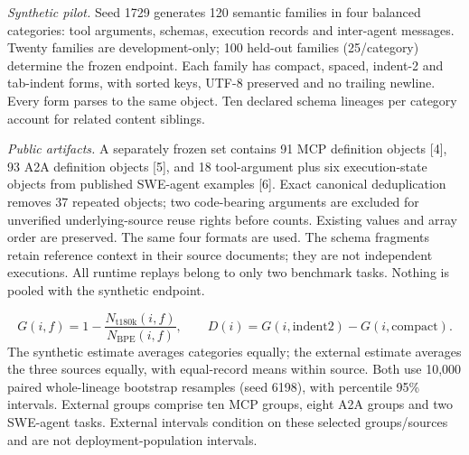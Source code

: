 \documentclass[10pt,a4paper]{article}
\begin{document}
\emph{Synthetic pilot.} Seed 1729 generates 120 semantic families in four
balanced categories: tool arguments, schemas, execution records and inter-agent
messages. Twenty families are development-only; 100 held-out families
(25/category) determine the frozen endpoint. Each family has compact, spaced,
indent-2 and tab-indent forms, with sorted keys, UTF-8 preserved and no trailing
newline. Every form parses to the same object. Ten declared schema lineages per
category account for related content siblings.

\emph{Public artifacts.} A separately frozen set contains 91 MCP definition
objects [4], 93 A2A definition objects [5], and 18 tool-argument plus six
execution-state objects from published SWE-agent examples [6].
Exact canonical deduplication removes 37 repeated objects; two code-bearing
arguments are excluded for unverified underlying-source reuse rights before
counts. Existing values and array order are preserved. The same four formats
are used. The schema fragments retain reference context in their source
documents; they are not independent executions. All runtime replays belong to
only two benchmark tasks. Nothing is pooled with the synthetic endpoint.

\[
G(i,f)=1-\frac{N_{\mathrm{t180k}}(i,f)}{N_{\mathrm{BPE}}(i,f)},\qquad
D(i)=G(i,\mathrm{indent2})-G(i,\mathrm{compact}).
\]
The synthetic estimate averages categories equally; the external estimate
averages the three sources equally, with equal-record means within source.
Both use 10,000 paired whole-lineage bootstrap resamples (seed 6198),
with percentile 95\% intervals. External groups comprise ten MCP groups,
eight A2A groups and two SWE-agent tasks. External intervals condition on
these selected groups/sources and are not deployment-population intervals.
\end{document}
